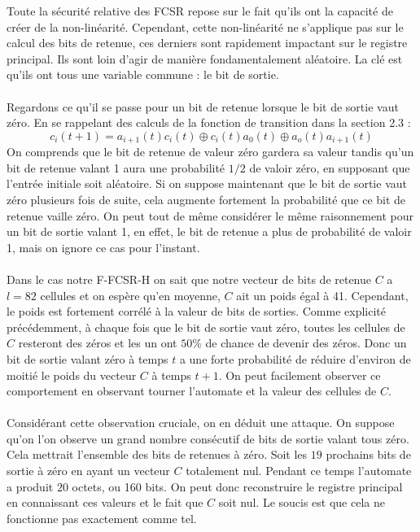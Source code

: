 \documentclass[11pt]{report}
\begin{document}
Toute la sécurité relative des FCSR repose sur le fait qu'ils ont la capacité de créer de la non-linéarité. Cependant, cette non-linéarité ne s'applique pas sur le calcul des bits de retenue, ces derniers sont rapidement impactant sur le registre principal. Ils sont loin d'agir de manière fondamentalement aléatoire. La clé est qu'ils ont tous une variable commune : le bit de sortie. 
\\
\\
Regardons ce qu'il se passe pour un bit de retenue lorsque le bit de sortie vaut zéro. En se rappelant des calculs de la fonction de transition dans la section 2.3 : 
$$
c_i(t+1) = a_{i+1}(t)c_i(t) \oplus c_i(t)a_0(t) \oplus a_o(t)a_{i+1}(t)
$$
On comprends que le bit de retenue de valeur zéro gardera sa valeur tandis qu'un bit de retenue valant 1 aura une probabilité $1/2$ de valoir zéro, en supposant que l'entrée initiale soit aléatoire. 
Si on suppose maintenant que le bit de sortie vaut zéro plusieurs fois de suite, cela augmente fortement la probabilité que ce bit de retenue vaille zéro. On peut tout de même considérer le même raisonnement pour un bit de sortie valant 1, en effet, le bit de retenue a plus de probabilité de valoir 1, mais on ignore ce cas pour l'instant. 
\\
\\
Dans le cas notre F-FCSR-H on sait que notre vecteur de bits de retenue $C$ a $l= 82$ cellules et on espère qu'en moyenne, $C$ ait un poids égal à 41. Cependant, le poids est fortement corrélé à la valeur de bits de sorties. Comme explicité précédemment, à chaque fois que le bit de sortie vaut zéro, toutes les cellules de $C$ resteront des zéros et les un ont $50\%$ de chance de devenir des zéros. Donc un bit de sortie valant zéro à temps $t$ a une forte probabilité de réduire d'environ de moitié le poids du vecteur $C$ à temps $t+1$. On peut facilement observer ce comportement en observant tourner l'automate et la valeur des cellules de $C$. 
\\
\\
Considérant cette observation cruciale, on en déduit une attaque. On suppose qu'on l'on observe un grand nombre consécutif de bits de sortie valant tous zéro. Cela mettrait l'ensemble des bits de retenues à zéro. Soit les $19$ prochains bits de sortie à zéro en ayant un vecteur $C$ totalement nul. Pendant ce temps l'automate a produit $20$ octets, ou 160 bits. On peut donc reconstruire le registre principal en connaissant ces valeurs et le fait que $C$ soit nul. Le soucis est que cela ne fonctionne pas exactement comme tel. 
\end{document}
